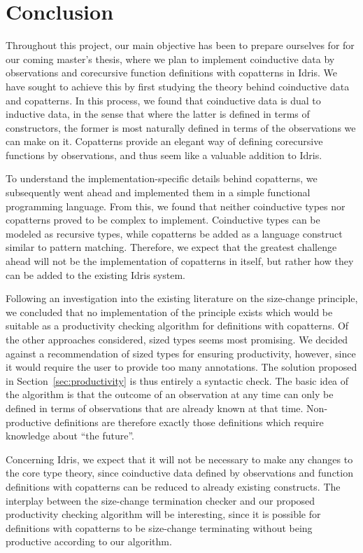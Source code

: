 \section{Conclusion}
\label{sec:conclusion}
Throughout this project, our main objective has been to prepare ourselves for for our coming master's thesis, where we plan to implement coinductive data by observations and corecursive function definitions with copatterns in Idris. We have sought to achieve this by first studying the theory behind coinductive data and copatterns. In this process, we found that coinductive data is dual to inductive data, in the sense that where the latter is defined in terms of constructors, the former is most naturally defined in terms of the observations we can make on it. Copatterns provide an elegant way of defining corecursive functions by observations, and thus seem like a valuable addition to Idris. 

To understand the implementation-specific details behind copatterns, we subsequently went ahead and implemented them in a simple functional programming language. From this, we found that neither coinductive types nor copatterns proved to be complex to implement. Coinductive types can be modeled as recursive types, while copatterns be added as a language construct similar to pattern matching. Therefore, we expect that the greatest challenge ahead will not be the implementation of copatterns in itself, but rather how they can be added to the existing Idris system.

Following an investigation into the existing literature on the size-change principle, we concluded that no implementation of the principle exists which would be suitable as a productivity checking algorithm for definitions with copatterns. Of the other approaches considered, sized types seems most promising. We decided against a recommendation of sized types for ensuring productivity, however, since it would require the user to provide too many annotations. The solution proposed in Section~\ref{sec:productivity} is thus entirely a syntactic check. The basic idea of the algorithm is that the outcome of an observation at any time can only be defined in terms of observations that are already known at that time. Non-productive definitions are therefore exactly those definitions which require knowledge about ``the future''.

Concerning Idris, we expect that it will not be necessary to make any changes to the core type theory, since coinductive data defined by observations and function definitions with copatterns can be reduced to already existing constructs. The interplay between the size-change termination checker and our proposed productivity checking algorithm will be interesting, since it is possible for definitions with copatterns to be size-change terminating without being productive according to our algorithm.


